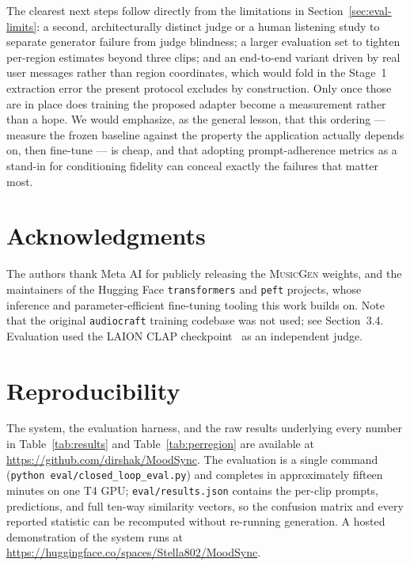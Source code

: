 \documentclass[11pt]{article}
\newcommand{\musicgen}{\textsc{MusicGen}}
\begin{document}
The clearest next steps follow directly from the limitations in Section~\ref{sec:eval-limits}: a second, architecturally distinct judge or a human listening study to separate generator failure from judge blindness; a larger evaluation set to tighten per-region estimates beyond three clips; and an end-to-end variant driven by real user messages rather than region coordinates, which would fold in the Stage~1 extraction error the present protocol excludes by construction. Only once those are in place does training the proposed adapter become a measurement rather than a hope. We would emphasize, as the general lesson, that this ordering --- measure the frozen baseline against the property the application actually depends on, then fine-tune --- is cheap, and that adopting prompt-adherence metrics as a stand-in for conditioning fidelity can conceal exactly the failures that matter most.

\section*{Acknowledgments}

The authors thank Meta AI for publicly releasing the \musicgen{} weights, and the maintainers of the Hugging Face \texttt{transformers} and \texttt{peft} projects, whose inference and parameter-efficient fine-tuning tooling this work builds on. Note that the original \texttt{audiocraft} training codebase was not used; see Section~3.4. Evaluation used the LAION CLAP checkpoint~\cite{wu2023clap} as an independent judge.

\section*{Reproducibility}

The system, the evaluation harness, and the raw results underlying every number in Table~\ref{tab:results} and Table~\ref{tab:perregion} are available at \url{https://github.com/dirshak/MoodSync}. The evaluation is a single command (\texttt{python eval/closed\_loop\_eval.py}) and completes in approximately fifteen minutes on one T4 GPU; \texttt{eval/results.json} contains the per-clip prompts, predictions, and full ten-way similarity vectors, so the confusion matrix and every reported statistic can be recomputed without re-running generation. A hosted demonstration of the system runs at \url{https://huggingface.co/spaces/Stella802/MoodSync}.
\end{document}
